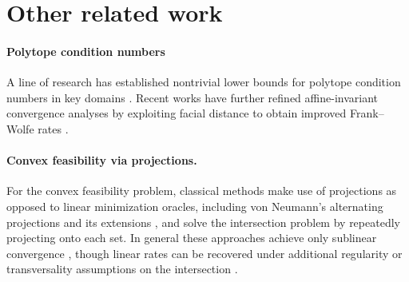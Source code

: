 \documentclass[twoside]{article}
\begin{document}

\section{Other related work} \label{s:literature}

\paragraph{Polytope condition numbers}  
A line of research has established nontrivial lower bounds for polytope condition numbers in key domains \citep{wirth2023approximate,CFK23}. Recent works have further refined affine-invariant convergence analyses by exploiting facial distance to obtain improved Frank–Wolfe rates \citep{wirth2025accelerated,pena2023affine}.

\paragraph{Convex feasibility via projections.}  
For the convex feasibility problem, classical methods make use of projections as opposed to linear minimization oracles, including von Neumann’s alternating projections and its extensions \citep{Von49,Gin18}, and solve the intersection problem by repeatedly projecting onto each set. In general these approaches achieve only sublinear convergence \citep{BS16,BC11,BPW23}, though linear rates can be recovered under additional regularity or transversality assumptions on the intersection \citep{GPR67,BB93,BB96,BT03,DIL15,BLM21,BBS21}.
\end{document}
